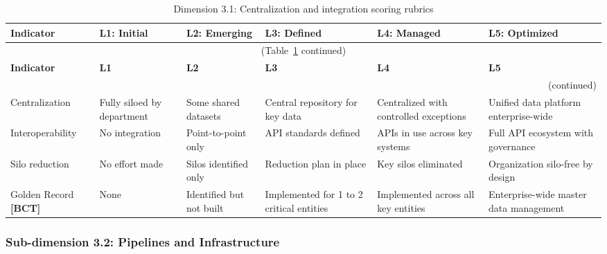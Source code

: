\begin{center}
{\small
\begin{longtable}{|p{2.4cm}|p{2.0cm}|p{2.0cm}|p{2.2cm}|p{2.2cm}|p{2.2cm}|}
\caption{Dimension 3.1: Centralization and integration scoring rubrics}\label{tab:d3-1}\\

\hline
\textbf{Indicator} & \textbf{L1: Initial} & \textbf{L2: Emerging} & \textbf{L3: Defined} & \textbf{L4: Managed} & \textbf{L5: Optimized} \\
\hline
\endfirsthead
\multicolumn{6}{c}{\small (Table~\ref{tab:d3-1} continued)} \\
\hline
\textbf{Indicator} & \textbf{L1} & \textbf{L2} & \textbf{L3} & \textbf{L4} & \textbf{L5} \\
\hline
\endhead
\hline
\multicolumn{6}{r}{\small (continued)} \\
\endfoot
\hline
\endlastfoot
Centralization &
  Fully siloed by department &
  Some shared datasets &
  Central repository for key data &
  Centralized with controlled exceptions &
  Unified data platform enterprise-wide \\
\hline
Interoperability &
  No integration &
  Point-to-point only &
  API standards defined &
  APIs in use across key systems &
  Full API ecosystem with governance \\
\hline
Silo reduction &
  No effort made &
  Silos identified only &
  Reduction plan in place &
  Key silos eliminated &
  Organization silo-free by design \\
\hline
Golden Record \textbf{[BCT]} &
  None &
  Identified but not built &
  Implemented for 1 to 2 critical entities &
  Implemented across all key entities &
  Enterprise-wide master data management \\
\hline
\end{longtable}
}
\end{center}

\subsubsection*{Sub-dimension 3.2: Pipelines and Infrastructure}

